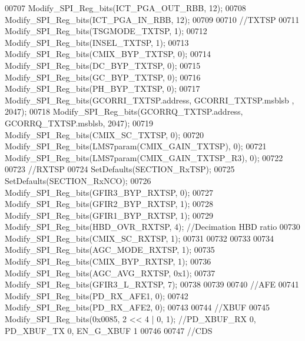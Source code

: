 \begin{DoxyCode}
{{{{{{{{{{{{{{{{00707 \textcolor{comment}{    Modify\_SPI\_Reg\_bits(ICT\_PGA\_OUT\_RBB, 12);}
00708 \textcolor{comment}{    Modify\_SPI\_Reg\_bits(ICT\_PGA\_IN\_RBB, 12);}
00709 \textcolor{comment}{}
00710 \textcolor{comment}{    //TXTSP}
00711 \textcolor{comment}{    Modify\_SPI\_Reg\_bits(TSGMODE\_TXTSP, 1);}
00712 \textcolor{comment}{    Modify\_SPI\_Reg\_bits(INSEL\_TXTSP, 1);}
00713 \textcolor{comment}{    Modify\_SPI\_Reg\_bits(CMIX\_BYP\_TXTSP, 0);}
00714 \textcolor{comment}{    Modify\_SPI\_Reg\_bits(DC\_BYP\_TXTSP, 0);}
00715 \textcolor{comment}{    Modify\_SPI\_Reg\_bits(GC\_BYP\_TXTSP, 0);}
00716 \textcolor{comment}{    Modify\_SPI\_Reg\_bits(PH\_BYP\_TXTSP, 0);}
00717 \textcolor{comment}{    Modify\_SPI\_Reg\_bits(GCORRI\_TXTSP.address, GCORRI\_TXTSP.msblsb , 2047);}
00718 \textcolor{comment}{    Modify\_SPI\_Reg\_bits(GCORRQ\_TXTSP.address, GCORRQ\_TXTSP.msblsb, 2047);}
00719 \textcolor{comment}{    Modify\_SPI\_Reg\_bits(CMIX\_SC\_TXTSP, 0);}
00720 \textcolor{comment}{    Modify\_SPI\_Reg\_bits(LMS7param(CMIX\_GAIN\_TXTSP), 0);}
00721 \textcolor{comment}{    Modify\_SPI\_Reg\_bits(LMS7param(CMIX\_GAIN\_TXTSP\_R3), 0);}
00722 \textcolor{comment}{}
00723 \textcolor{comment}{    //RXTSP}
00724 \textcolor{comment}{    SetDefaults(SECTION\_RxTSP);}
00725 \textcolor{comment}{    SetDefaults(SECTION\_RxNCO);}
00726 \textcolor{comment}{    Modify\_SPI\_Reg\_bits(GFIR3\_BYP\_RXTSP, 0);}
00727 \textcolor{comment}{    Modify\_SPI\_Reg\_bits(GFIR2\_BYP\_RXTSP, 1);}
00728 \textcolor{comment}{    Modify\_SPI\_Reg\_bits(GFIR1\_BYP\_RXTSP, 1);}
00729 \textcolor{comment}{    Modify\_SPI\_Reg\_bits(HBD\_OVR\_RXTSP, 4); //Decimation HBD ratio}
00730 \textcolor{comment}{    Modify\_SPI\_Reg\_bits(CMIX\_SC\_RXTSP, 1);}
00731 \textcolor{comment}{}
00732 \textcolor{comment}{}
00733 \textcolor{comment}{}
00734 \textcolor{comment}{    Modify\_SPI\_Reg\_bits(AGC\_MODE\_RXTSP, 1);}
00735 \textcolor{comment}{    Modify\_SPI\_Reg\_bits(CMIX\_BYP\_RXTSP, 1);}
00736 \textcolor{comment}{    Modify\_SPI\_Reg\_bits(AGC\_AVG\_RXTSP, 0x1);}
00737 \textcolor{comment}{    Modify\_SPI\_Reg\_bits(GFIR3\_L\_RXTSP, 7);}
00738 \textcolor{comment}{}
00739 \textcolor{comment}{}
00740 \textcolor{comment}{    //AFE}
00741 \textcolor{comment}{    Modify\_SPI\_Reg\_bits(PD\_RX\_AFE1, 0);}
00742 \textcolor{comment}{    Modify\_SPI\_Reg\_bits(PD\_RX\_AFE2, 0);}
00743 \textcolor{comment}{}
00744 \textcolor{comment}{    //XBUF}
00745 \textcolor{comment}{    Modify\_SPI\_Reg\_bits(0x0085, 2 << 4 | 0, 1); //PD\_XBUF\_RX 0, PD\_XBUF\_TX 0, EN\_G\_XBUF 1}
00746 \textcolor{comment}{}
00747 \textcolor{comment}{    //CDS}
}}}}}}}}}}}}}}}}
\end{DoxyCode}

